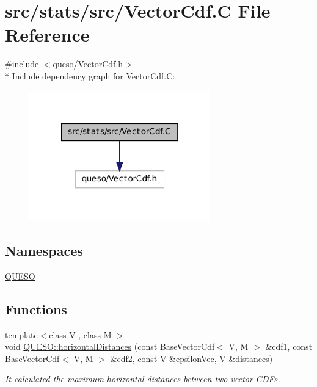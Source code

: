 \hypertarget{_vector_cdf_8_c}{\section{src/stats/src/\-Vector\-Cdf.C File Reference}
\label{_vector_cdf_8_c}
}
{\ttfamily \#include $<$queso/\-Vector\-Cdf.\-h$>$}\\*
Include dependency graph for Vector\-Cdf.\-C\-:
\nopagebreak
\begin{figure}[H]
\begin{center}
\leavevmode
\includegraphics[width=222pt]{_vector_cdf_8_c__incl}
\end{center}
\end{figure}
\subsection*{Namespaces}
\begin{DoxyCompactItemize}
\item 
\hyperlink{namespace_q_u_e_s_o}{Q\-U\-E\-S\-O}
\end{DoxyCompactItemize}
\subsection*{Functions}
\begin{DoxyCompactItemize}
\item 
{\footnotesize template$<$class V , class M $>$ }\\void \hyperlink{namespace_q_u_e_s_o_aa34cd1eb7f035b5e6f8d8c090f02d65f}{Q\-U\-E\-S\-O\-::horizontal\-Distances} (const Base\-Vector\-Cdf$<$ V, M $>$ \&cdf1, const Base\-Vector\-Cdf$<$ V, M $>$ \&cdf2, const V \&epsilon\-Vec, V \&distances)
\begin{DoxyCompactList}\small\item\em It calculated the maximum horizontal distances between two vector C\-D\-Fs. \end{DoxyCompactList}\end{DoxyCompactItemize}
